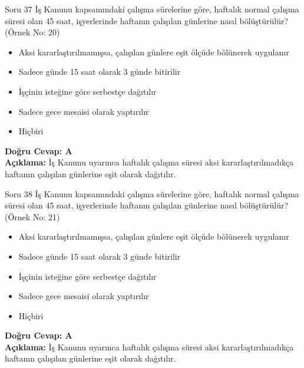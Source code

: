 \documentclass[12pt,a4paper]{article}
\begin{document}
\begin{testcard}{Soru 37}
    İş Kanunu kapsamındaki çalışma sürelerine göre, haftalık normal çalışma süresi olan 45 saat, işyerlerinde haftanın çalışılan günlerine nasıl bölüştürülür? (Örnek No: 20)
    \begin{itemize}
        \item[A)] Aksi kararlaştırılmamışsa, çalışılan günlere eşit ölçüde bölünerek uygulanır
        \item[B)] Sadece günde 15 saat olarak 3 günde bitirilir
        \item[C)] İşçinin isteğine göre serbestçe dağıtılır
        \item[D)] Sadece gece mesaisi olarak yaptırılır
        \item[E)] Hiçbiri
    \end{itemize}
    \tcblower
    \textbf{Doğru Cevap: A} \\
    \textbf{Açıklama:} İş Kanunu uyarınca haftalık çalışma süresi aksi kararlaştırılmadıkça haftanın çalışılan günlerine eşit olarak dağıtılır.
\end{testcard}

\begin{testcard}{Soru 38}
    İş Kanunu kapsamındaki çalışma sürelerine göre, haftalık normal çalışma süresi olan 45 saat, işyerlerinde haftanın çalışılan günlerine nasıl bölüştürülür? (Örnek No: 21)
    \begin{itemize}
        \item[A)] Aksi kararlaştırılmamışsa, çalışılan günlere eşit ölçüde bölünerek uygulanır
        \item[B)] Sadece günde 15 saat olarak 3 günde bitirilir
        \item[C)] İşçinin isteğine göre serbestçe dağıtılır
        \item[D)] Sadece gece mesaisi olarak yaptırılır
        \item[E)] Hiçbiri
    \end{itemize}
    \tcblower
    \textbf{Doğru Cevap: A} \\
    \textbf{Açıklama:} İş Kanunu uyarınca haftalık çalışma süresi aksi kararlaştırılmadıkça haftanın çalışılan günlerine eşit olarak dağıtılır.
\end{testcard}
\end{document}
